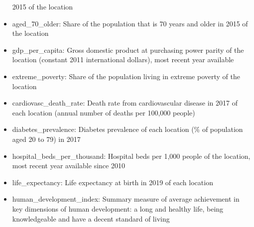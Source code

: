 \documentclass[]{article}
\begin{document}
\begin{itemize}
  2015 of the location
\item
  aged\_70\_older: Share of the population that is 70 years and older in
  2015 of the location
\item
  gdp\_per\_capita: Gross domestic product at purchasing power parity of
  the location (constant 2011 international dollars), most recent year
  available\\
\item
  extreme\_poverty: Share of the population living in extreme poverty of
  the location
\item
  cardiovasc\_death\_rate: Death rate from cardiovascular disease in
  2017 of each location (annual number of deaths per 100,000 people)\\
\item
  diabetes\_prevalence: Diabetes prevalence of each location (\% of
  population aged 20 to 79) in 2017
\item
  hospital\_beds\_per\_thousand: Hospital beds per 1,000 people of the
  location, most recent year available since 2010
\item
  life\_expectancy: Life expectancy at birth in 2019 of each location
\item
  human\_development\_index: Summary measure of average achievement in
  key dimensions of human development: a long and healthy life, being
  knowledgeable and have a decent standard of living
\end{itemize}
\end{document}
